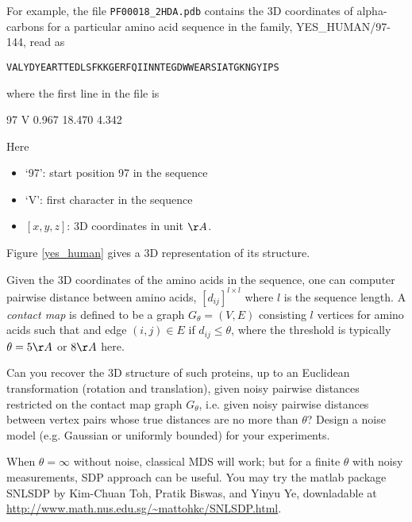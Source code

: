 \documentclass[11pt]{article}
\begin{document}
For example, the file {\tt PF00018\_2HDA.pdb} contains the 3D coordinates of alpha-carbons for a particular amino acid sequence in the family, YES\_HUMAN/97-144, read as

{\tt{VALYDYEARTTEDLSFKKGERFQIINNTEGDWWEARSIATGKNGYIPS}}

\noindent where the first line in the file is 

97	V	0.967	18.470	4.342

\noindent Here
\begin{itemize}
\item `97': start position 97 in the sequence
\item `V': first character in the sequence
\item $[x,y,z]$: 3D coordinates in unit $\AA$.
\end{itemize}

\noindent Figure \ref{yes_human} gives a 3D representation of its structure. 


Given the 3D coordinates of the amino acids in the sequence, one can computer pairwise distance between amino acids, $[d_{ij}]^{l\times l}$ where $l$ is the sequence length. A \emph{contact map} is defined to be a graph $G_\theta=(V,E)$ consisting $l$ vertices for amino acids such that and edge $(i,j)\in E$ if $d_{ij} \leq \theta$, where the threshold is typically $\theta=5\AA$ or $8\AA$ here. 

Can you recover the 3D structure of such proteins, up to an Euclidean transformation (rotation and translation), given noisy pairwise distances restricted on the contact map graph $G_\theta$, i.e. given noisy pairwise distances between vertex pairs whose true distances are no more than $\theta$? Design a noise model (e.g. Gaussian or uniformly bounded) for your experiments. 

When $\theta=\infty$ without noise, classical MDS will work; but for a finite $\theta$ with noisy measurements, SDP approach can be useful. You may try the matlab package SNLSDP by Kim-Chuan Toh, Pratik Biswas, and Yinyu Ye, downladable at \url{http://www.math.nus.edu.sg/~mattohkc/SNLSDP.html}. 


%
%
%
\end{document}
